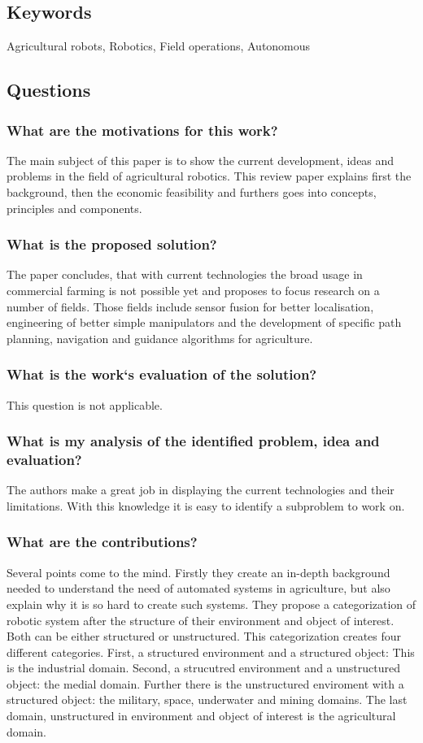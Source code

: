 \subsection*{Keywords}
Agricultural robots, Robotics, Field operations, Autonomous


\subsection*{Questions}

\subsubsection*{What are the motivations for this work?}
The main subject of this paper is to show the current development, ideas and problems in the field of agricultural 
robotics. This review paper explains first the background, then the economic feasibility and furthers goes into 
concepts, principles and components.
\subsubsection*{What is the proposed solution?} 
The paper concludes, that with current technologies the broad usage in commercial farming is not possible yet and 
proposes to focus research on a number of fields. Those fields include sensor fusion for better localisation, 
engineering of better simple manipulators and the development of specific path planning, navigation and guidance algorithms
for agriculture.
\subsubsection*{What is the work`s evaluation of the solution?}
This question is not applicable.
\subsubsection*{What is my analysis of the identified problem, idea and evaluation?}
The authors make a great job in displaying the current technologies and their limitations. With this knowledge it is 
easy to identify a subproblem to work on.
\subsubsection*{What are the contributions?}
Several points come to the mind. Firstly they create an in-depth background needed to understand the need of automated
systems in agriculture, but also explain why it is so hard to create such systems. 
They propose a categorization of robotic system after the structure of their environment and object of interest. Both 
can be either structured or unstructured. This categorization creates four different categories. First, a structured 
environment and a structured object: This is the industrial domain. Second, a strucutred environment and a unstructured
object: the medial domain. Further there is the unstructured enviroment with a structured object: the military, space, underwater
and mining domains. The last domain, unstructured in environment and object of interest is the agricultural domain.

